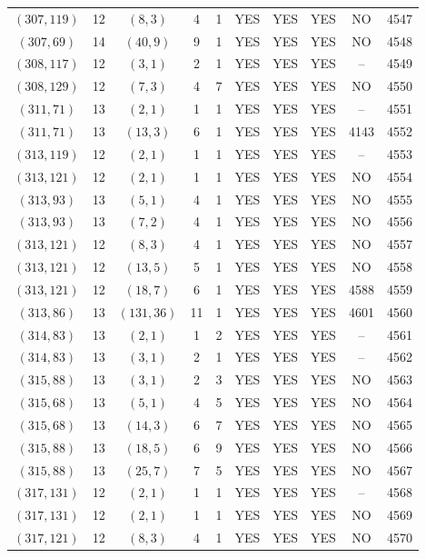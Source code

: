 \begin{longtable}{|c|c|c|c|c|c|c|c|c|c|}
$(307, 119)$ & 12 & $(8, 3)$ & 4 & 1 & YES & YES & YES & NO & 4547\\
$(307, 69)$ & 14 & $(40, 9)$ & 9 & 1 & YES & YES & YES & NO & 4548\\
$(308, 117)$ & 12 & $(3, 1)$ & 2 & 1 & YES & YES & YES & -- & 4549\\
$(308, 129)$ & 12 & $(7, 3)$ & 4 & 7 & YES & YES & YES & NO & 4550\\
$(311, 71)$ & 13 & $(2, 1)$ & 1 & 1 & YES & YES & YES & -- & 4551\\
$(311, 71)$ & 13 & $(13, 3)$ & 6 & 1 & YES & YES & YES & 4143 & 4552\\
$(313, 119)$ & 12 & $(2, 1)$ & 1 & 1 & YES & YES & YES & -- & 4553\\
$(313, 121)$ & 12 & $(2, 1)$ & 1 & 1 & YES & YES & YES & NO & 4554\\
$(313, 93)$ & 13 & $(5, 1)$ & 4 & 1 & YES & YES & YES & NO & 4555\\
$(313, 93)$ & 13 & $(7, 2)$ & 4 & 1 & YES & YES & YES & NO & 4556\\
$(313, 121)$ & 12 & $(8, 3)$ & 4 & 1 & YES & YES & YES & NO & 4557\\
$(313, 121)$ & 12 & $(13, 5)$ & 5 & 1 & YES & YES & YES & NO & 4558\\
$(313, 121)$ & 12 & $(18, 7)$ & 6 & 1 & YES & YES & YES & 4588 & 4559\\
$(313, 86)$ & 13 & $(131, 36)$ & 11 & 1 & YES & YES & YES & 4601 & 4560\\
$(314, 83)$ & 13 & $(2, 1)$ & 1 & 2 & YES & YES & YES & -- & 4561\\
$(314, 83)$ & 13 & $(3, 1)$ & 2 & 1 & YES & YES & YES & -- & 4562\\
$(315, 88)$ & 13 & $(3, 1)$ & 2 & 3 & YES & YES & YES & NO & 4563\\
$(315, 68)$ & 13 & $(5, 1)$ & 4 & 5 & YES & YES & YES & NO & 4564\\
$(315, 68)$ & 13 & $(14, 3)$ & 6 & 7 & YES & YES & YES & NO & 4565\\
$(315, 88)$ & 13 & $(18, 5)$ & 6 & 9 & YES & YES & YES & NO & 4566\\
$(315, 88)$ & 13 & $(25, 7)$ & 7 & 5 & YES & YES & YES & NO & 4567\\
$(317, 131)$ & 12 & $(2, 1)$ & 1 & 1 & YES & YES & YES & -- & 4568\\
$(317, 131)$ & 12 & $(2, 1)$ & 1 & 1 & YES & YES & YES & NO & 4569\\
$(317, 121)$ & 12 & $(8, 3)$ & 4 & 1 & YES & YES & YES & NO & 4570\\

\end{longtable}
